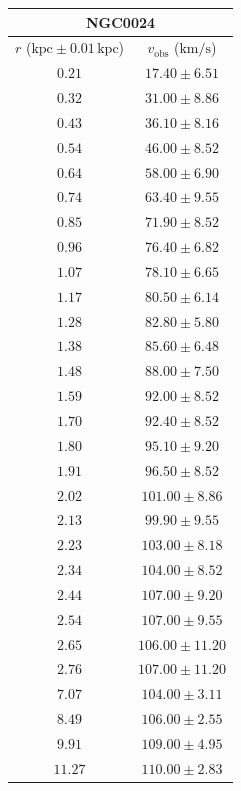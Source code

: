 \documentclass{article}
\newcommand\kpc{\textrm{kpc}}
\newcommand\kmps{\textrm{km}/\textrm{s}}
\newcommand\vobs{\ensuremath{v_{\textrm{obs}}}}
\begin{document}
\begin{table}[h!]
    \begin{tabular}{|c|c|}
        \hline
        \multicolumn{2}{|c|}{NGC0024} \\
        \hline
        $r$ ($\kpc \pm 0.01 \,\kpc$) & $\vobs$ ($\kmps$) \\
        \hline
        $0.21$ & $17.40 \pm 6.51$ \\
        $0.32$ & $31.00 \pm 8.86$ \\
        $0.43$ & $36.10 \pm 8.16$ \\
        $0.54$ & $46.00 \pm 8.52$ \\
        $0.64$ & $58.00 \pm 6.90$ \\
        $0.74$ & $63.40 \pm 9.55$ \\
        $0.85$ & $71.90 \pm 8.52$ \\
        $0.96$ & $76.40 \pm 6.82$ \\
        $1.07$ & $78.10 \pm 6.65$ \\
        $1.17$ & $80.50 \pm 6.14$ \\
        $1.28$ & $82.80 \pm 5.80$ \\
        $1.38$ & $85.60 \pm 6.48$ \\
        $1.48$ & $88.00 \pm 7.50$ \\
        $1.59$ & $92.00 \pm 8.52$ \\
        $1.70$ & $92.40 \pm 8.52$ \\
        $1.80$ & $95.10 \pm 9.20$ \\
        $1.91$ & $96.50 \pm 8.52$ \\
        $2.02$ & $101.00 \pm 8.86$ \\
        $2.13$ & $99.90 \pm 9.55$ \\
        $2.23$ & $103.00 \pm 8.18$ \\
        $2.34$ & $104.00 \pm 8.52$ \\
        $2.44$ & $107.00 \pm 9.20$ \\
        $2.54$ & $107.00 \pm 9.55$ \\
        $2.65$ & $106.00 \pm 11.20$ \\
        $2.76$ & $107.00 \pm 11.20$ \\
        $7.07$ & $104.00 \pm 3.11$ \\
        $8.49$ & $106.00 \pm 2.55$ \\
        $9.91$ & $109.00 \pm 4.95$ \\
        $11.27$ & $110.00 \pm 2.83$ \\
        \hline

\end{tabular}
\end{table}
\end{document}
